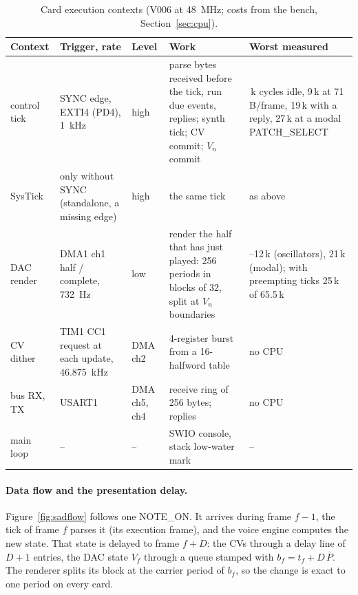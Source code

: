 \begin{table}[htbp]
\centering\small
\caption{Card execution contexts (V006 at \SI{48}{MHz}; costs from the bench, Section~\ref{sec:cpu}).}\label{tab:sadexec}
\setlength{\tabcolsep}{4pt}
\begin{tabularx}{\textwidth}{@{}>{\raggedright}p{1.9cm} >{\raggedright}p{2.9cm} >{\raggedright}p{1.3cm} >{\raggedright}X >{\raggedright\arraybackslash}p{3.7cm}@{}}
\toprule
Context & Trigger, rate & Level & Work & Worst measured \\
\midrule
control tick & SYNC edge, EXTI4 (PD4), \SI{1}{kHz} & high & parse bytes received before the tick, run due
  events, replies; synth tick; CV commit; $V_n$ commit & 7\,k cycles idle, 9\,k at 71\,B/frame, 19\,k with a reply,
  27\,k at a modal PATCH\_SELECT \\
SysTick & only without SYNC (standalone, a missing edge) & high & the same tick & as above \\
DAC render & DMA1 ch1 half / complete, \SI{732}{Hz} & low & render the half that has just played: 256 periods in
  blocks of 32, split at $V_n$ boundaries & 8--12\,k (oscillators), 21\,k (modal); with preempting ticks 25\,k of
  65.5\,k \\
CV dither & TIM1 CC1 request at each update, \SI{46.875}{kHz} & DMA ch2 & 4-register burst from a 16-halfword table &
  no CPU \\
bus RX, TX & USART1 & DMA ch5, ch4 & receive ring of 256 bytes; replies & no CPU \\
main loop & -- & -- & SWIO console, stack low-water mark & -- \\
\bottomrule
\end{tabularx}
\end{table}

\paragraph{Data flow and the presentation delay.} Figure~\ref{fig:sadflow} follows one NOTE\_ON. It arrives during
frame $f-1$, the tick of frame $f$ parses it (its execution frame), and the voice engine computes the new state.
That state is delayed to frame $f + D$: the CVs through a delay line of $D + 1$ entries, the DAC state $V_f$ through a
queue stamped with $b_f = t_f + D\,\bar P$. The renderer splits its block at the carrier period of $b_f$, so the
change is exact to one period on every card.


